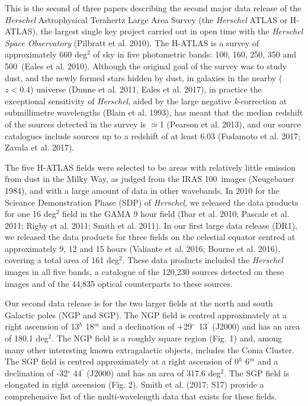 \documentclass[useAMS,usenatbib]{mn2e}
\begin{document}
This is the second of three papers describing the second major data release of the
{\it Herschel} Astrophysical Terahertz Large Area Survey (the {\it Herschel}
ATLAS or H-ATLAS), the largest single key project carried out
in open time with the {\it Herschel Space Observatory} (Pilbratt et al.
2010).
The H-ATLAS is a survey of approximately 660 deg$^2$ of sky
in five photometric bands: 100, 160, 250, 350 and 500\micron\ (Eales et al.
2010).
Although the original goal of the survey was to study dust, and the newly formed
stars hidden by dust,
in galaxies in the nearby ($z<0.4$) universe (Dunne et al. 2011,
Eales et al. 2017), in practice the
exceptional sensitivity of {\it Herschel}, aided by
the large negative {\it k}-correction at submillimetre wavelengths
(Blain et al. 1993), has meant that the median 
redshift of the sources detected in the survey is $\simeq$1 (Pearson et
al. 2013), and our source catalogues
include sources up to a redshift of at least 6.03 (Fudamoto et al. 2017;
Zavala et al. 2017).

The five H-ATLAS fields were selected to be areas with relatively little emission
from dust in the Milky Way, as judged from the IRAS 100\micron\ images (Neugebauer
1984), and with a large
amount of data in other wavebands. In 2010 for the 
Scieance Demonstration Phase (SDP) of {\it Herschel}, we released the data
products
for one
16 deg$^2$ field in the GAMA 9 hour 
field (Ibar et al. 2010; Pascale et al. 2011; Rigby et al. 2011; Smith et
al. 2011).
In our first large data release (DR1), we released
the data products for 
three fields
on the celestial equator centred at 
approximately 9, 12 and 15 hours (Valiante et al. 2016; Bourne et al.
2016), covering
a total area of 161 deg$^2$.
These data products included the {\it Herschel} images in all five bands,
a catalogue of the 120,230 
sources detected on these images and of the 44,835 optical counterparts to
these sources.

Our second data release is for the two larger fields at the north and south Galactic
poles (NGP and SGP). The NGP field is centred 
approximately at a right ascension of 13$^{h}$ 18$^{m}$ and
a declination of +29$^{\circ}$\ 13$^{\prime}$ (J2000) and has
an area of 180.1 deg$^2$. 
The NGP field is a roughly square region
(Fig. 1) and, among many other interesting known
extragalactic objects, includes the Coma Cluster.
The SGP field is centred approximately at a right ascension of 0$^{h}$ 6$^{m}$ and a declination of -32$^{\circ}$ 44$^{\prime}$ (J2000)
and has an area of 317.6 deg$^2$. The SGP field is elongated
in right ascension (Fig. 2).
Smith et al. (2017; S17) provide a comprehensive list
of the multi-wavelength data that exists for these fields.
\end{document}
